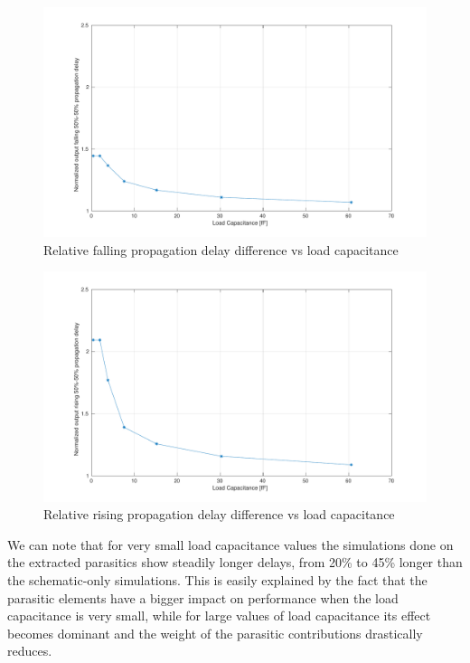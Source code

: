 \documentclass[a4paper]{article}
\begin{document}
\begin{figure}[H]
	\centering
	\includegraphics[width=\linewidth]{../INV_X4/simulations/tp_L_diff.pdf}
	\caption{Relative falling propagation delay difference vs load capacitance}
	\label{fig:inv_tp_L_diff}
\end{figure}
\begin{figure}[H]
	\centering
	\includegraphics[width=\linewidth]{../INV_X4/simulations/tp_H_diff.pdf}
	\caption{Relative rising propagation delay difference vs load capacitance}
	\label{fig:inv_tp_H_diff}
\end{figure}

We can note that for very small load capacitance values the simulations done on the extracted parasitics show steadily longer delays, from 20\% to 45\% longer than the schematic-only simulations. This is easily explained by the fact that the parasitic elements have a bigger impact on performance when the load capacitance is very small, while for large values of load capacitance its effect becomes dominant and the weight of the parasitic contributions drastically reduces.
\end{document}
